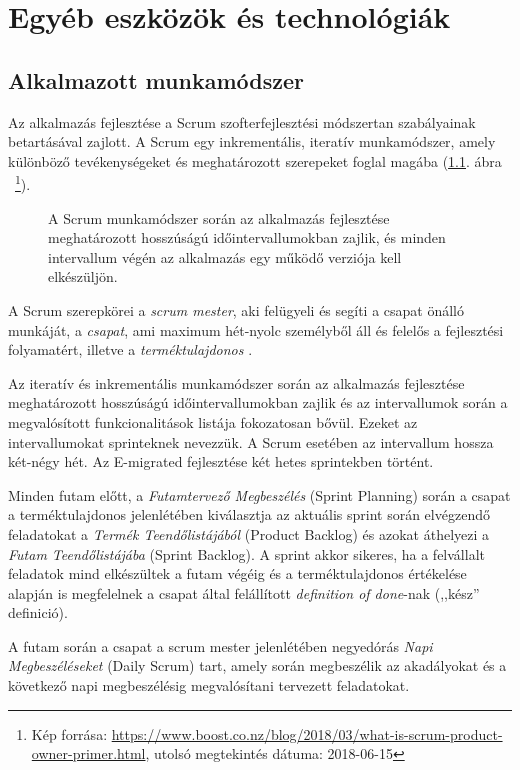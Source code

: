 \chapter{Egyéb eszközök és technológiák}\label{ch:egyebb_eszkozok}
\section{Alkalmazott munkamódszer}
Az alkalmazás fejlesztése a Scrum szofterfejlesztési módszertan szabályainak betartásával zajlott. A Scrum egy inkrementális, iteratív munkamódszer, amely különböző tevékenységeket és meghatározott szerepeket foglal magába (\ref{fig:scrum}. ábra ~\footnote{Kép forrása: \url{https://www.boost.co.nz/blog/2018/03/what-is-scrum-product-owner-primer.html}, utolsó megtekintés dátuma: 2018-06-15}). 
\begin{figure}
  \centering
  \caption{A Scrum munkamódszer során az alkalmazás fejlesztése meghatározott hosszúságú időintervallumokban zajlik, és minden intervallum végén az alkalmazás egy működő verziója kell elkészüljön.}
  \label{fig:scrum}
\end{figure}
A Scrum szerepkörei a \textit{scrum mester}, aki felügyeli és segíti a csapat önálló munkáját, a \textit{csapat}, ami maximum hét-nyolc személyből áll és felelős a fejlesztési folyamatért, illetve a \textit{terméktulajdonos} \cite{Scrum}. 

Az iteratív és inkrementális munkamódszer során az alkalmazás fejlesztése meghatározott hosszúságú időintervallumokban zajlik és az intervallumok során a megvalósított funkcionalitások listája fokozatosan bővül. Ezeket az intervallumokat sprinteknek nevezzük. A Scrum esetében az intervallum hossza két-négy hét. Az E-migrated fejlesztése két hetes sprintekben történt.

Minden futam előtt, a \textit{Futamtervező Megbeszélés} (Sprint Planning) során a csapat a terméktulajdonos jelenlétében kiválasztja az aktuális sprint során elvégzendő feladatokat a \textit{Termék Teendőlistájából} (Product Backlog) és azokat áthelyezi a \textit{Futam Teendőlistájába} (Sprint Backlog). A sprint akkor sikeres, ha a felvállalt feladatok mind elkészültek a futam végéig és a terméktulajdonos értékelése alapján is megfelelnek a csapat által felállított \textit{definition of done}-nak (,,kész'' definició). 

A futam során a csapat a scrum mester jelenlétében negyedórás \textit{Napi Megbeszéléseket} (Daily Scrum) tart, amely során megbeszélik az akadályokat és a következő napi megbeszélésig megvalósítani tervezett feladatokat. 


